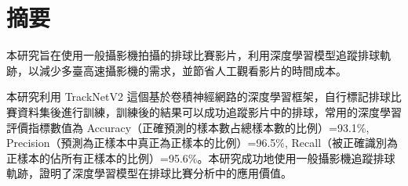 \section{摘要}

本研究旨在使用一般攝影機拍攝的排球比賽影片，利用深度學習模型追蹤排球軌跡，以減少多臺高速攝影機的需求，並節省人工觀看影片的時間成本。

本研究利用 TrackNetV2 這個基於卷積神經網路的深度學習框架，自行標記排球比賽資料集後進行訓練，訓練後的結果可以成功追蹤影片中的排球，常用的深度學習評價指標數值為 Accuracy（正確預測的樣本數占總樣本數的比例）=93.1\%, Precision（預測為正樣本中真正為正樣本的比例）=96.5\%, Recall（被正確識別為正樣本的佔所有正樣本的比例）=95.6\%。本研究成功地使用一般攝影機追蹤排球軌跡，證明了深度學習模型在排球比賽分析中的應用價值。